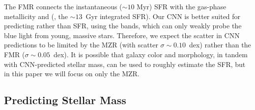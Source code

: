 \documentclass[fleqn,usenatbib]{mnras}
\begin{document}
The FMR connects the instantaneous ($\sim 10$ Myr) SFR with the gas-phase metallicity \citep[$\sim 1$~Gyr timescales; see, e.g.,][]{2011ApJ...734...48L} and \mstar{} (\ie, the $\sim 13$~Gyr integrated SFR). Our CNN is better suited for predicting \mstar{} rather than SFR, using the \sdssi\sdssr\sdssg{} bands, which can only weakly probe the blue light from young, massive stars. Therefore, we expect the scatter in CNN predictions to be limited by the MZR (with scatter $\sigma \sim 0.10$~dex) rather than the FMR ($\sigma \sim 0.05$~dex). It is possible that galaxy color and morphology, in tandem with CNN-predicted stellar mass, can be used to roughly estimate the SFR, but in this paper we will focus on only the MZR.


\subsection{Predicting Stellar Mass}
\end{document}
